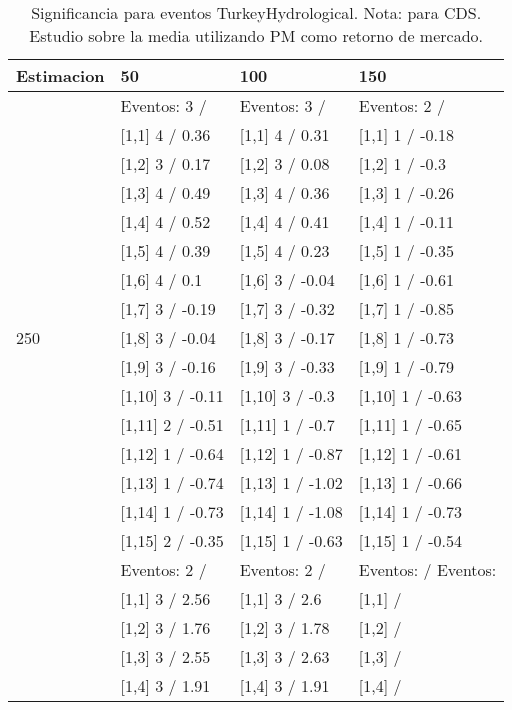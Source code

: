 \begin{table}

\caption{Significancia para eventos TurkeyHydrological. Nota: para CDS. Estudio sobre la media utilizando PM como retorno de mercado.}
\centering
\begin{tabular}[t]{llll}
\toprule
Estimacion & 50 & 100 & 150\\
\midrule
 & Eventos:  3 / & Eventos:  3 / & Eventos:  2 /\\
 & {}[1,1] 4  / 0.36 & {}[1,1] 4  / 0.31 & {}[1,1] 1  / -0.18\\
 & {}[1,2] 3  / 0.17 & {}[1,2] 3  / 0.08 & {}[1,2] 1  / -0.3\\
 & {}[1,3] 4  / 0.49 & {}[1,3] 4  / 0.36 & {}[1,3] 1  / -0.26\\
 & {}[1,4] 4  / 0.52 & {}[1,4] 4  / 0.41 & {}[1,4] 1  / -0.11\\
\addlinespace
 & {}[1,5] 4  / 0.39 & {}[1,5] 4  / 0.23 & {}[1,5] 1  / -0.35\\
 & {}[1,6] 4  / 0.1 & {}[1,6] 3  / -0.04 & {}[1,6] 1  / -0.61\\
 & {}[1,7] 3  / -0.19 & {}[1,7] 3  / -0.32 & {}[1,7] 1  / -0.85\\
250 & {}[1,8] 3  / -0.04 & {}[1,8] 3  / -0.17 & {}[1,8] 1  / -0.73\\
 & {}[1,9] 3  / -0.16 & {}[1,9] 3  / -0.33 & {}[1,9] 1  / -0.79\\
\addlinespace
 & {}[1,10] 3  / -0.11 & {}[1,10] 3  / -0.3 & {}[1,10] 1  / -0.63\\
 & {}[1,11] 2  / -0.51 & {}[1,11] 1  / -0.7 & {}[1,11] 1  / -0.65\\
 & {}[1,12] 1  / -0.64 & {}[1,12] 1  / -0.87 & {}[1,12] 1  / -0.61\\
 & {}[1,13] 1  / -0.74 & {}[1,13] 1  / -1.02 & {}[1,13] 1  / -0.66\\
 & {}[1,14] 1  / -0.73 & {}[1,14] 1  / -1.08 & {}[1,14] 1  / -0.73\\
\addlinespace
 & {}[1,15] 2  / -0.35 & {}[1,15] 1  / -0.63 & {}[1,15] 1  / -0.54\\
 & Eventos:  2 / & Eventos:  2 / & Eventos:   / Eventos:\\
 & {}[1,1] 3  / 2.56 & {}[1,1] 3  / 2.6 & {}[1,1]  /\\
 & {}[1,2] 3  / 1.76 & {}[1,2] 3  / 1.78 & {}[1,2]  /\\
 & {}[1,3] 3  / 2.55 & {}[1,3] 3  / 2.63 & {}[1,3]  /\\
\addlinespace
 & {}[1,4] 3  / 1.91 & {}[1,4] 3  / 1.91 & {}[1,4]  /\\

\end{tabular}
\end{table}
